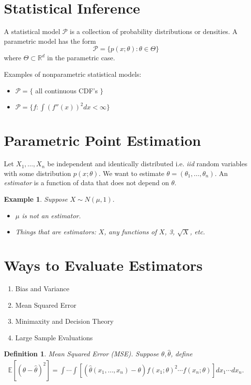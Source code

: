 \documentclass[10pt]{article}
\newtheorem{definition}[def]{Definition}
\newtheorem{example}[ex]{Example}
\newcommand{\Expect}[1]{\mathbb{E}\!\left[#1\right]}
\newcommand{\R}{\mathbb{R}}
\renewcommand{\hat}{\widehat}
\newcommand{\calP}{\mathcal{P}}
\begin{document}
\section{Statistical Inference}
\label{sec:stat-inference}
A statistical model $\calP$ is a collection of probability
distributions or densities. A parametric model has the
form 
\begin{equation} 
  \calP = \{p(x;\theta):\theta\in\Theta\}
\end{equation}
where $\Theta\subset\R^d$ in the parametric case.

Examples of nonparametric statistical models:
\begin{itemize}
\item $\calP= \{$ all continuous CDF's $\}$
\item   $\calP = \{f:\int(f''(x))^2dx<\infty\}$
\end{itemize}


\section{Parametric Point Estimation}
\label{sec:parametric-point-estimation}
Let $X_1,\ldots,X_n$ be independent and identically distributed
i.e. {\em iid} random variables with some distribution
$p(x;\theta)$. We want to estimate $\theta =
(\theta_1,\dots,\theta_n)$. An {\em estimator} is a function of data
that does not depend on $\theta$.


\begin{example}
  Suppose $X\sim N(\mu,1)$.
  \begin{itemize}
  \item $\mu$ is not an estimator.
  \item Things that are estimators: $X$, any functions of $X$, 3,
    $\sqrt{X}$, etc.
  \end{itemize}
\end{example}

\section{Ways to Evaluate Estimators}
\label{sec:estimator-evaluation}
\begin{enumerate}
\item Bias and Variance
\item Mean Squared Error
\item Minimaxity and Decision Theory
\item Large Sample Evaluations
\end{enumerate}
\begin{definition}{Mean Squared Error (MSE)}. Suppose $\theta, \hat\theta$, define 
\begin{align}
\Expect{ \left(\theta - \hat\theta \right)^2 } = \int \cdots \int \left[ \left( \hat\theta(x_1, \ldots, x_n) - \theta\right) f(x_1;\theta)^2 \cdots f(x_n;\theta) \right] dx_1 \cdots dx_n.
\end{align}
\end{definition}
\end{document}

